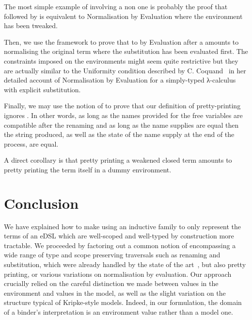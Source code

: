 The most simple example of   involving a non
 one is probably the proof that  followed
by  is equivalent to Normalisation by Evaluation
where the environment has been tweaked.


Then, we use the framework to prove that to  by
Evaluation after a  amounts to normalising the original
term where the substitution has been evaluated first. The constraints
imposed on the environments might seem quite restrictive but they are
actually similar to the Uniformity condition described by C. Coquand~\cite{coquand2002formalised}
in her detailed account of Normalisation by Evaluation for a simply-typed
λ-calculus with explicit substitution.


Finally, we may use the notion of  to prove that our
definition of pretty-printing ignores . In other
words, as long as the names provided for the free variables are
compatible after the renaming and as long as the name supplies
are equal then the string produced, as well as the state of the
name supply at the end of the process, are equal.


A direct corollary is that pretty printing a weakened closed term
amounts to pretty printing the term itself in a dummy environment.


\section{Conclusion}

We have explained how to make using an inductive family to only represent
the terms of an eDSL which are well-scoped and well-typed by construction
more tractable. We proceeded by factoring out a common notion of 
encompassing a wide range of type and scope preserving traversals such as
renaming and substitution, which were already handled by the state of the
art~\cite{mcbride2005type,benton2012strongly}, but also pretty printing, or
various variations on normalisation by evaluation.
Our approach crucially relied on the careful distinction we made between
values in the environment and values in the model, as well as the slight
variation on the structure typical of Kripke-style models. Indeed, in our
formulation, the domain of a binder's interpretation is an environment
value rather than a model one.

